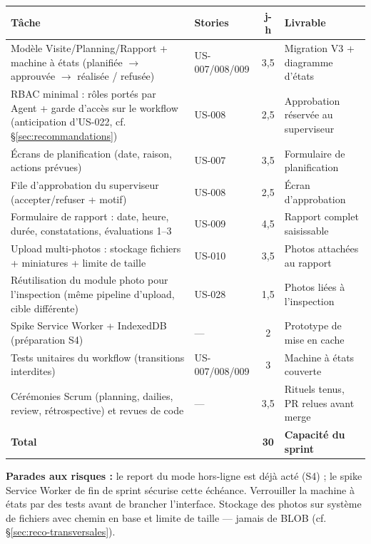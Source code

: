 \begin{center}
\small
\begin{tabular}{p{7.2cm}lcp{4.6cm}}
\toprule
\textbf{Tâche} & \textbf{Stories} & \textbf{j-h} & \textbf{Livrable} \\
\midrule
Modèle Visite/Planning/Rapport + machine à états
(planifiée $\rightarrow$ approuvée $\rightarrow$ réalisée / refusée) & US-007/008/009 & 3,5 & Migration V3 + diagramme d'états \\
RBAC minimal : rôles portés par Agent + garde d'accès sur le workflow
(anticipation d'US-022, cf. §\ref{sec:recommandations}) & US-008 & 2,5 & Approbation réservée au superviseur \\
Écrans de planification (date, raison, actions prévues) & US-007 & 3,5 & Formulaire de planification \\
File d'approbation du superviseur (accepter/refuser + motif) & US-008 & 2,5 & Écran d'approbation \\
Formulaire de rapport : date, heure, durée, constatations,
évaluations 1--3 & US-009 & 4,5 & Rapport complet saisissable \\
Upload multi-photos : stockage fichiers + miniatures + limite de taille & US-010 & 3,5 & Photos attachées au rapport \\
Réutilisation du module photo pour l'inspection (même pipeline
d'upload, cible différente) & US-028 & 1,5 & Photos liées à l'inspection \\
Spike Service Worker + IndexedDB (préparation S4) & --- & 2 & Prototype de mise en cache \\
Tests unitaires du workflow (transitions interdites) & US-007/008/009 & 3 & Machine à états couverte \\
\addlinespace
Cérémonies Scrum (planning, dailies, review, rétrospective) et
revues de code & --- & 3,5 & Rituels tenus, PR relues avant merge \\
\midrule
\textbf{Total} & & \textbf{30} & \textbf{Capacité du sprint} \\
\bottomrule
\end{tabular}
\end{center}

\textbf{Parades aux risques :} le report du mode hors-ligne est déjà acté
(S4) ; le spike Service Worker de fin de sprint sécurise cette échéance.
Verrouiller la machine à états par des tests avant de brancher l'interface.
Stockage des photos sur système de fichiers avec chemin en base et limite
de taille --- jamais de BLOB (cf. §\ref{sec:reco-transversales}).

